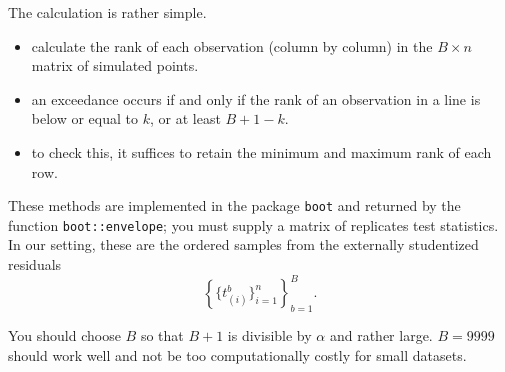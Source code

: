 \documentclass[]{book}
\providecommand{\tightlist}{%
  \setlength{\itemsep}{0pt}\setlength{\parskip}{0pt}}
\theoremstyle{definition}
\theoremstyle{definition}
\theoremstyle{definition}
\theoremstyle{remark}
\begin{document}
The calculation is rather simple.

\begin{itemize}
\tightlist
\item
  calculate the rank of each observation (column by column) in the
  \(B \times n\) matrix of simulated points.
\item
  an exceedance occurs if and only if the rank of an observation in a
  line is below or equal to \(k\), or at least \(B+1-k\).
\item
  to check this, it suffices to retain the minimum and maximum rank of
  each row.
\end{itemize}

These methods are implemented in the package \texttt{boot} and returned
by the function \texttt{boot::envelope}; you must supply a matrix of
replicates test statistics. In our setting, these are the ordered
samples from the externally studentized residuals
\[\left\{\big\{t^{b}_{(i)}\big\}_{i=1}^n\right\}_{b=1}^B.\]

You should choose \(B\) so that \(B+1\) is divisible by \(\alpha\) and
rather large. \(B = 9999\) should work well and not be too
computationally costly for small datasets.
\end{document}
